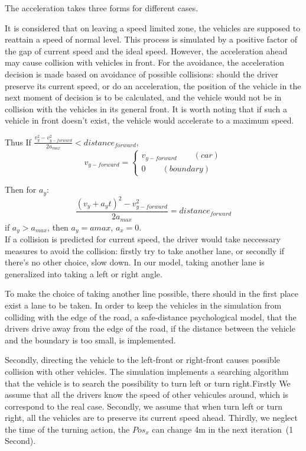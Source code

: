 \documentclass{mcmthesis}
\begin{document}
The acceleration takes three forms for different cases.

It is considered that on leaving a speed limited zone, the vehicles are supposed to reattain a speed of normal level. This process is simulated by a positive factor of the gap of current speed and the ideal speed. However, the acceleration ahead may cause collision with vehicles in front. For the avoidance, the acceleration decision is made based on avoidance of possible collisions: should the driver preserve its current speed, or do an acceleration, the position of the vehicle in the next moment of decision is to be calculated, and the vehicle would not be in collision with the vehicles in its general front. It is worth noting that if such a vehicle in front doesn't exist, the vehicle would accelerate to a maximum speed.

Thus %
If $\frac{v_y^2-v_{y-forward}^2}{2a_{max}}<distance_{forward}$,
$$v_{y-forward}= \left\{ 
\begin{aligned}
v_{y-forward} \qquad (car)\\
0 \qquad (boundary)
\end{aligned}
\right.
$$

Then for $a_y$:
$$\frac{(v_y+a_yt)^2-v_{y-forward}^2}{2a_{max}}=distance_{forward}$$
if $a_y>a_{max}$, then $a_y=a{max}$, $a_x=0$.\\

If a collision is predicted for current speed, the driver would take neccessary measures to avoid the collision: firstly try to take another lane, or secondly if there's no other choice, slow down. In our model, taking another lane is generalized into taking a left or right angle.

To make the choice of taking another line possible, there should in the first place exist a lane to be taken. In order to keep the vehicles in the simulation from colliding with the edge of the road, a safe-distance psychological model, that the drivers drive away from the edge of the road, if the distance between the vehicle and the boundary is too small, is implemented. 

Secondly, directing the vehicle to the left-front or right-front causes possible collision with other vehicles. The simulation implements a searching algorithm that the vehicle is to search the possibility to turn left or turn right.Firstly We assume that all the drivers know the speed of other vehicules around, which is correspond to the real case. Secondly, we assume that when turn left or turn right, all the vehicles are to preserve its current speed ahead. Thirdly, we neglect the time of the turning action, the $Pos_x$ can change 4m in the next iteration\ (1 Second).
\end{document}
